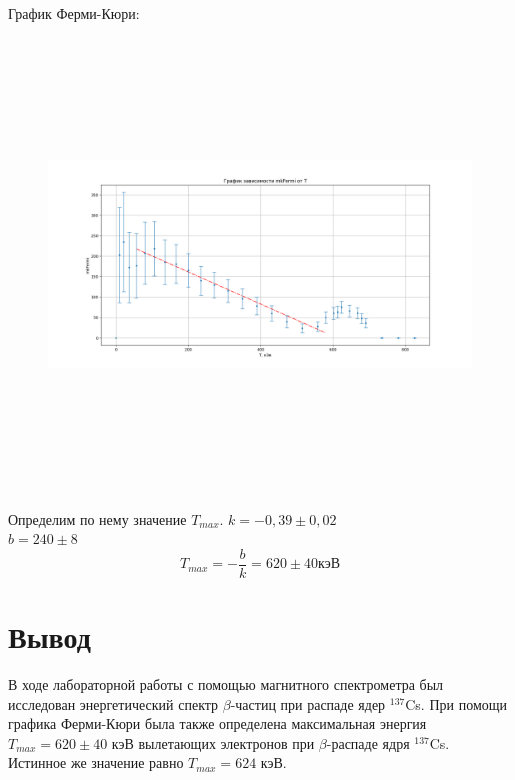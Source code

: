 \documentclass[a4paper,12pt]{article}
\begin{document}
График Ферми-Кюри:
		\begin{figure}[H]
			\begin{floatrow}
			{\includegraphics[width=20cm,height=12cm, left]{graph4.png}}   
			\end{floatrow}
		\end{figure}
	
Определим по нему значение $T_{max}$.
$k = -0,39 \pm 0,02$ \\
$b = 240 \pm 8$ \\
\[T_{max} = -\frac{b}{k} = 620 \pm 40 \text{кэВ}\]
\section{Вывод}
В ходе лабораторной работы с помощью магнитного спектрометра был исследован энергетический спектр $\beta$-частиц при распаде ядер $^{137}$Cs. При помощи графика Ферми-Кюри была также определена максимальная энергия $T_{max} = 620 \pm 40$ кэВ вылетающих электронов при $\beta$-распаде ядря $^{137}$Cs. Истинное же значение равно $T_{max} = 624$ кэВ.
\end{document}
